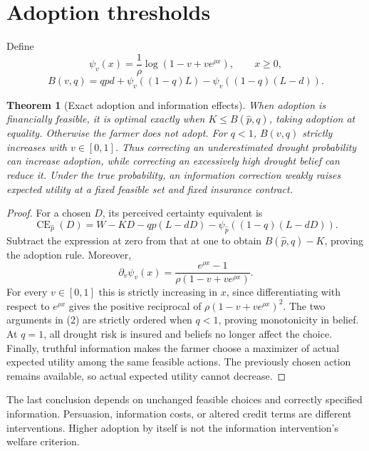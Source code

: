 \documentclass[11pt,a4paper]{article}
\newtheorem{theorem}{Theorem}[section]
\theoremstyle{remark}
\begin{document}
\section{Adoption thresholds}
Define
\[
 \psi_v(x)=\frac1\rho\log(1-v+ve^{\rho x}),\qquad x\ge0,
\]
\[
 B(v,q)=qpd+\psi_v((1-q)L)-\psi_v((1-q)(L-d)). \tag{2}
\]
\begin{theorem}[Exact adoption and information effects]
When adoption is financially feasible, it is optimal exactly when $K\le B(\widehat p,q)$, taking adoption at equality. Otherwise the farmer does not adopt. For $q<1$, $B(v,q)$ strictly increases with $v\in[0,1]$. Thus correcting an underestimated drought probability can increase adoption, while correcting an excessively high drought belief can reduce it. Under the true probability, an information correction weakly raises expected utility at a fixed feasible set and fixed insurance contract.
\end{theorem}
\begin{proof}
For a chosen $D$, its perceived certainty equivalent is
\[
 \operatorname{CE}_{\widehat p}(D)
 =W-KD-qp(L-dD)-\psi_{\widehat p}((1-q)(L-dD)).
\]
Subtract the expression at zero from that at one to obtain $B(\widehat p,q)-K$, proving the adoption rule. Moreover,
\[
 \partial_v\psi_v(x)=\frac{e^{\rho x}-1}{\rho(1-v+ve^{\rho x})}.
\]
For every $v\in[0,1]$ this is strictly increasing in $x$, since differentiating with respect to $e^{\rho x}$ gives the positive reciprocal of $\rho(1-v+ve^{\rho x})^2$. The two arguments in (2) are strictly ordered when $q<1$, proving monotonicity in belief. At $q=1$, all drought risk is insured and beliefs no longer affect the choice. Finally, truthful information makes the farmer choose a maximizer of actual expected utility among the same feasible actions. The previously chosen action remains available, so actual expected utility cannot decrease.
\end{proof}
The last conclusion depends on unchanged feasible choices and correctly specified information. Persuasion, information costs, or altered credit terms are different interventions. Higher adoption by itself is not the information intervention's welfare criterion.
\end{document}
